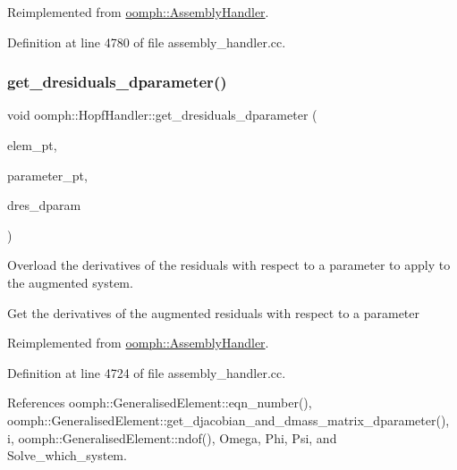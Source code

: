 Reimplemented from \hyperlink{classoomph_1_1AssemblyHandler_aefc0c13a65342806c167c5d53f014803}{oomph\+::\+Assembly\+Handler}.



Definition at line 4780 of file assembly\+\_\+handler.\+cc.

\mbox{\label{classoomph_1_1HopfHandler_a2953368ecc48dc22f8ea1f563064ece2}} 
\subsubsection{\texorpdfstring{get\+\_\+dresiduals\+\_\+dparameter()}{get\_dresiduals\_dparameter()}}
{\footnotesize\ttfamily void oomph\+::\+Hopf\+Handler\+::get\+\_\+dresiduals\+\_\+dparameter (\begin{DoxyParamCaption}\item[{\hyperlink{classoomph_1_1GeneralisedElement}{Generalised\+Element} $\ast$const \&}]{elem\+\_\+pt,  }\item[{double $\ast$const \&}]{parameter\+\_\+pt,  }\item[{\hyperlink{classoomph_1_1Vector}{Vector}$<$ double $>$ \&}]{dres\+\_\+dparam }\end{DoxyParamCaption})\hspace{0.3cm}{\ttfamily [virtual]}}



Overload the derivatives of the residuals with respect to a parameter to apply to the augmented system. 

Get the derivatives of the augmented residuals with respect to a parameter 

Reimplemented from \hyperlink{classoomph_1_1AssemblyHandler_a2ee980ccabe0ad82f98e694eecf270bb}{oomph\+::\+Assembly\+Handler}.



Definition at line 4724 of file assembly\+\_\+handler.\+cc.



References oomph\+::\+Generalised\+Element\+::eqn\+\_\+number(), oomph\+::\+Generalised\+Element\+::get\+\_\+djacobian\+\_\+and\+\_\+dmass\+\_\+matrix\+\_\+dparameter(), i, oomph\+::\+Generalised\+Element\+::ndof(), Omega, Phi, Psi, and Solve\+\_\+which\+\_\+system.

